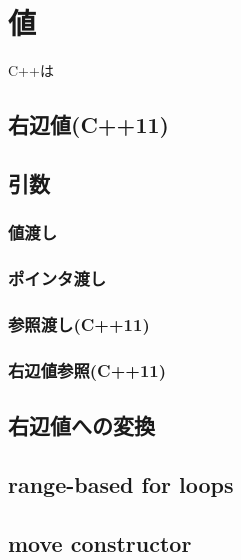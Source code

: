 
\section{値}
C++は


\subsection{右辺値(C++11)}


\subsection{引数}

\subsubsection{値渡し}


\subsubsection{ポインタ渡し}


\subsubsection{参照渡し(C++11)}

\subsubsection{右辺値参照(C++11)}



\subsection{右辺値への変換}



\subsection{range-based for loops}


\subsection{move constructor}

